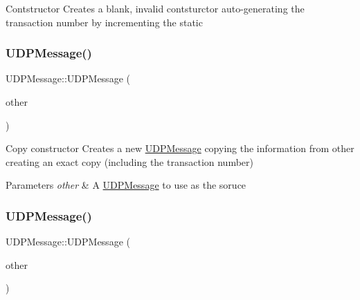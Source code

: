 Contstructor Creates a blank, invalid contsturctor auto-\/generating the transaction number by incrementing the static \mbox{\label{class_u_d_p_message_adbc0139ef0249efd4a932bbc0b57fe13}} 
\subsubsection{\texorpdfstring{U\+D\+P\+Message()}{UDPMessage()}\hspace{0.1cm}{\footnotesize\ttfamily [2/3]}}
{\footnotesize\ttfamily U\+D\+P\+Message\+::\+U\+D\+P\+Message (\begin{DoxyParamCaption}\item[{const \hyperlink{class_u_d_p_message}{U\+D\+P\+Message} \&}]{other }\end{DoxyParamCaption})\hspace{0.3cm}{\ttfamily [inline]}}

Copy constructor Creates a new \hyperlink{class_u_d_p_message}{U\+D\+P\+Message} copying the information from other creating an exact copy (including the transaction number) 
\begin{DoxyParams}{Parameters}
{\em other} & A \hyperlink{class_u_d_p_message}{U\+D\+P\+Message} to use as the soruce \\
\hline
\end{DoxyParams}
\mbox{\label{class_u_d_p_message_a6edf87f4f8f441edf2064d5f6fa5cd02}} 
\subsubsection{\texorpdfstring{U\+D\+P\+Message()}{UDPMessage()}\hspace{0.1cm}{\footnotesize\ttfamily [3/3]}}
{\footnotesize\ttfamily U\+D\+P\+Message\+::\+U\+D\+P\+Message (\begin{DoxyParamCaption}\item[{const \hyperlink{struct_u_d_p_message_struct}{U\+D\+P\+Message\+Struct} \&}]{other }\end{DoxyParamCaption})\hspace{0.3cm}{\ttfamily [inline]}}

